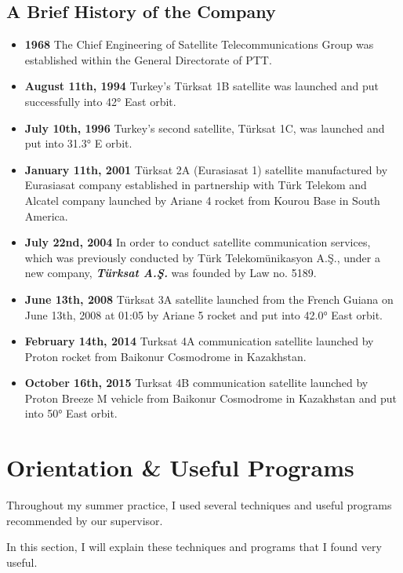 \subsection{A Brief History of the Company}
\begin{itemize}
\item \textbf{1968} 
\subitem The Chief Engineering of Satellite Telecommunications Group was established within the General Directorate of PTT. 
\item \textbf{ August 11th, 1994 } 
\subitem Turkey's Türksat 1B satellite was launched and put successfully into 42° East orbit.
\item \textbf{ July 10th, 1996 }
\subitem Turkey's second satellite, Türksat 1C, was launched and put into 31.3° E orbit. 
\item \textbf{ January 11th, 2001 }
\subitem Türksat 2A (Eurasiasat 1) satellite manufactured by Eurasiasat company established in partnership with Türk Telekom and Alcatel company launched by Ariane 4 rocket from Kourou Base in South America. 
\item \textbf{ July 22nd, 2004 } 
\subitem In order to conduct satellite communication services, which was previously conducted by Türk Telekomünikasyon A.Ş., under a new company, \textit{ \textbf{ Türksat A.Ş. }} was founded by Law no. 5189. 
\item \textbf{ June 13th, 2008 }
\subitem Türksat 3A satellite launched from the French Guiana on June 13th, 2008 at 01:05 by Ariane 5 rocket and put into 42.0° East orbit. 
\item \textbf{ February 14th, 2014  }
\subitem Turksat 4A communication satellite launched by Proton rocket from Baikonur Cosmodrome in Kazakhstan. 
\item \textbf{  October 16th, 2015 }
\subitem Turksat 4B communication satellite launched by Proton Breeze M vehicle from Baikonur Cosmodrome in Kazakhstan and put into 50° East orbit. 
\end{itemize}


\section{Orientation \& Useful Programs}
\-
\indent Throughout my summer practice, I used several techniques and useful programs recommended by our supervisor. 
	
	In this section, I will explain these techniques and programs that I found very useful.

